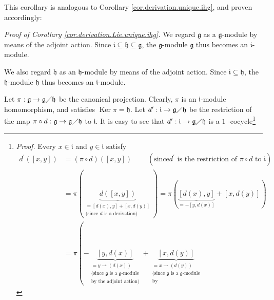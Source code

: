 \documentclass[etingof-lie.tex]{subfiles}
\begin{document}
\begin{verlong}
This corollary is analogous to Corollary \ref{cor.derivation.unique.ihg}, and
proven accordingly:

\textit{Proof of Corollary \ref{cor.derivation.Lie.unique.ihg}.} We regard
$\mathfrak{g}$ as a $\mathfrak{g}$-module by means of the adjoint action.
Since $\mathfrak{i}\subseteq\mathfrak{h}\subseteq\mathfrak{g}$, the
$\mathfrak{g}$-module $\mathfrak{g}$ thus becomes an $\mathfrak{i}$-module.

We also regard $\mathfrak{h}$ as an $\mathfrak{h}$-module by means of the
adjoint action. Since $\mathfrak{i}\subseteq\mathfrak{h}$, the $\mathfrak{h}%
$-module $\mathfrak{h}$ thus becomes an $\mathfrak{i}$-module.

Let $\pi:\mathfrak{g}\rightarrow\mathfrak{g}\diagup\mathfrak{h}$ be the
canonical projection. Clearly, $\pi$ is an $\mathfrak{i}$-module homomorphism,
and satisfies $\operatorname*{Ker}\pi=\mathfrak{h}$. Let $d^{\prime
}:\mathfrak{i}\rightarrow\mathfrak{g}\diagup\mathfrak{h}$ be the restriction
of the map $\pi\circ d:\mathfrak{g}\rightarrow\mathfrak{g}\diagup\mathfrak{h}$
to $\mathfrak{i}$. It is easy to see that $d^{\prime}:\mathfrak{i}%
\rightarrow\mathfrak{g}\diagup\mathfrak{h}$ is a $1$%
-cocycle\footnote{\textit{Proof.} Every $x\in\mathfrak{i}$ and $y\in
\mathfrak{i}$ satisfy%
\begin{align*}
d^{\prime}\left(  \left[  x,y\right]  \right)   &  =\left(  \pi\circ d\right)
\left(  \left[  x,y\right]  \right)  \ \ \ \ \ \ \ \ \ \ \left(  \text{since
}d^{\prime}\text{ is the restriction of }\pi\circ d\text{ to }\mathfrak{i}%
\right) \\
&  =\pi\left(  \underbrace{d\left(  \left[  x,y\right]  \right)
}_{\substack{=\left[  d\left(  x\right)  ,y\right]  +\left[  x,d\left(
y\right)  \right]  \\\text{(since }d\text{ is a derivation)}}}\right)
=\pi\left(  \underbrace{\left[  d\left(  x\right)  ,y\right]  }_{=-\left[
y,d\left(  x\right)  \right]  }+\left[  x,d\left(  y\right)  \right]  \right)
\\
&  =\pi\left(  -\underbrace{\left[  y,d\left(  x\right)  \right]
}_{\substack{=y\rightharpoonup\left(  d\left(  x\right)  \right)
\\\text{(since }\mathfrak{g}\text{ is a }\mathfrak{g}\text{-module}\\\text{by
the adjoint action)}}}+\underbrace{\left[  x,d\left(  y\right)  \right]
}_{\substack{=x\rightharpoonup\left(  d\left(  y\right)  \right)
\\\text{(since }\mathfrak{g}\text{ is a }\mathfrak{g}\text{-module}\\\text{by
}}}
\end{align*}}
\end{verlong}
\end{document}
